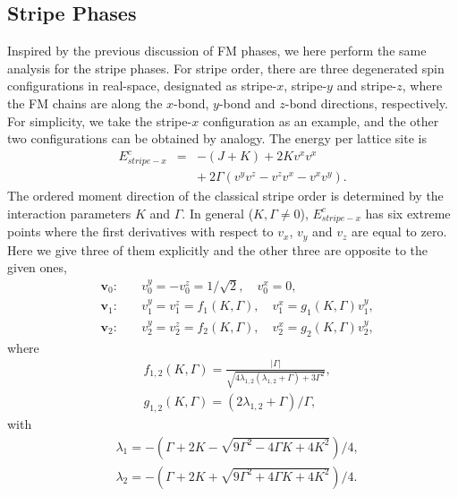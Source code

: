 \documentclass[aps,prb,reprint,amsfonts,amsmath,amssymb,showpacs,groupedaddress,superscriptaddress]{revtex4-1}
\begin{document}
\subsection{\label{subsec:StripePhases}Stripe Phases}

Inspired by the previous discussion of FM phases, we here perform the same analysis for the stripe phases. For stripe order, there are three degenerated spin configurations in real-space, designated as stripe-$x$, stripe-$y$ and stripe-$z$, where the FM chains are along the $x$-bond, $y$-bond and $z$-bond directions, respectively. For simplicity, we take the stripe-$x$ configuration as an example, and the other two configurations can be obtained by analogy. The energy per lattice site is
\begin{eqnarray}
    E_{stripe-x}^{c} & = & -(J + K) + 2 K v^x v^x \nonumber \\
        & & +\: 2 \Gamma (v^y v^z - v^z v^x - v^x v^y).
        \label{eq:EcStripeX}
\end{eqnarray}
The ordered moment direction of the classical stripe order is determined by the interaction parameters $K$ and $\Gamma$. In general ($K,\Gamma \neq 0$), $E_{stripe-x}^{c}$ has six extreme points where the first derivatives with respect to $v_x$, $v_y$ and $v_z$ are equal to zero. Here we give three of them explicitly and the other three are opposite to the given ones,
\begin{subequations}
    \label{eq:whole}
    \begin{eqnarray}
        & \bm{v}_0:& \quad v_{0}^{y}=-v_{0}^{z} = 1/\sqrt{2}, \quad v_{0}^{x} = 0, \label{eq:v0} \\
        & \bm{v}_1:& \quad v_{1}^{y}=v_{1}^{z} = f_{1}(K, \Gamma), \quad v_{1}^{x} = g_{1}(K, \Gamma) v_{1}^{y}, \label{eq:v1} \\
        & \bm{v}_2:& \quad v_{2}^{y}=v_{2}^{z} = f_{2}(K, \Gamma), \quad v_{2}^{x} = g_{2}(K, \Gamma) v_{2}^{y}, \label{eq:v2}
    \end{eqnarray}
\end{subequations}
where
\begin{align}
& f_{1,2}(K, \Gamma)= \frac{|\Gamma|}{\sqrt{4 \lambda_{1,2} (\lambda_{1,2} + \Gamma) + 3 \Gamma^{2}}}, \nonumber \\
& g_{1,2}(K, \Gamma)= (2 \lambda_{1,2} + \Gamma) / \Gamma, \nonumber
\end{align}
with
\begin{align}
& \lambda_{1}=- (\Gamma +2 K - \sqrt{9\Gamma^2 - 4 \Gamma K + 4 K^2}) / 4, \nonumber \\
& \lambda_{2}=-(\Gamma +2 K + \sqrt{9\Gamma^2 + 4 \Gamma K + 4 K^2}) / 4. \nonumber
\end{align}
\end{document}
